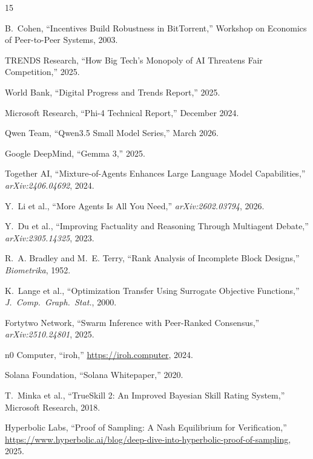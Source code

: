 \documentclass[11pt,a4paper]{article}
\begin{document}
\begin{thebibliography}{15}

B.~Cohen, ``Incentives Build Robustness in BitTorrent,'' Workshop on Economics of Peer-to-Peer Systems, 2003.

TRENDS Research, ``How Big Tech's Monopoly of AI Threatens Fair Competition,'' 2025.

World Bank, ``Digital Progress and Trends Report,'' 2025.

Microsoft Research, ``Phi-4 Technical Report,'' December 2024.

Qwen Team, ``Qwen3.5 Small Model Series,'' March 2026.

Google DeepMind, ``Gemma 3,'' 2025.

Together AI, ``Mixture-of-Agents Enhances Large Language Model Capabilities,'' \textit{arXiv:2406.04692}, 2024.

Y.~Li et al., ``More Agents Is All You Need,'' \textit{arXiv:2602.03794}, 2026.

Y.~Du et al., ``Improving Factuality and Reasoning Through Multiagent Debate,'' \textit{arXiv:2305.14325}, 2023.

R.~A. Bradley and M.~E. Terry, ``Rank Analysis of Incomplete Block Designs,'' \textit{Biometrika}, 1952.

K.~Lange et al., ``Optimization Transfer Using Surrogate Objective Functions,'' \textit{J.~Comp.~Graph.~Stat.}, 2000.


Fortytwo Network, ``Swarm Inference with Peer-Ranked Consensus,'' \textit{arXiv:2510.24801}, 2025.

n0 Computer, ``iroh,'' \url{https://iroh.computer}, 2024.

Solana Foundation, ``Solana Whitepaper,'' 2020.

T.~Minka et al., ``TrueSkill 2: An Improved Bayesian Skill Rating System,'' Microsoft Research, 2018.

Hyperbolic Labs, ``Proof of Sampling: A Nash Equilibrium for Verification,'' \url{https://www.hyperbolic.ai/blog/deep-dive-into-hyperbolic-proof-of-sampling}, 2025.

\end{thebibliography}
\end{document}
